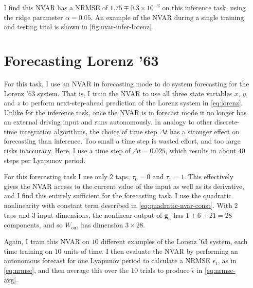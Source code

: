 I find this NVAR has a NRMSE of $1.75\mp0.3\times10^{-2}$ on this
inference task, using the ridge parameter $\alpha = 0.05$. An example of the NVAR during a
single training and testing trial is shown in
\cref{fig:nvar-infer-lorenz}.

\section{Forecasting Lorenz '63}

For this task, I use an NVAR in forecasting mode to do system
forecasting for the Lorenz '63 system. That is, I train the NVAR to use all
three state variables $x$, $y$, and $z$ to perform next-step-ahead
prediction of the Lorenz system in \cref{eq:lorenz}. Unlike for the inference task, once
the NVAR is in forecast mode it no longer has an external driving
input and runs autonomously. In analogy to other discrete-time integration algorithms, the choice of time step
$\Delta t$ has a stronger effect on forecasting than inference. Too
small a time step is wasted effort, and too large risks
inaccuracy. Here, I use a time step of $\Delta t = 0.025$, which results in about $40$ steps per Lyapunov period.

For this forecasting task I use only $2$ taps, $\tau_0 = 0$ and
$\tau_1 = 1$. This effectively gives the NVAR access to the current
value of the input as well as its derivative, and I find this
entirely sufficient for the forecasting task.
I use the quadratic nonlinearity with constant term described
in \cref{eq:quadratic-nvar-const}. With 2 taps and 3 input dimensions, the nonlinear output
of $\bm{g}_\text{n}$ has $1 + 6 + 21 = 28$ components, and so $W_\text{out}$ has
dimension $3 \times 28$.

Again, I train this NVAR on $10$ different examples of the Lorenz '63
system, each time training on $10$ units of time. I then evaluate the
NVAR by performing an autonomous forecast for one Lyapunov period to
calculate a NRMSE $\epsilon_1$, as in \cref{eq:nrmse}, and then
average this over the $10$ trials to produce $\tilde{\epsilon}$ in
\cref{eq:nrmse-avg}.

